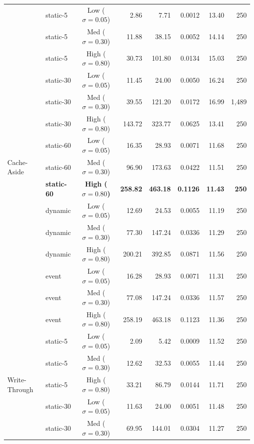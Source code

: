 \documentclass[11pt,a4paper]{article}
\begin{document}
\begin{small}
\begin{longtable}{llcrrrrr}
\multirow{15}{*}{Cache-Aside}
  & static-5  & Low ($\sigma=0.05$)    &   2.86 &   7.71 & 0.0012 & 13.40 & 250 \\
  & static-5  & Med ($\sigma=0.30$)    &  11.88 &  38.15 & 0.0052 & 14.14 & 250 \\
  & static-5  & High ($\sigma=0.80$)   &  30.73 & 101.80 & 0.0134 & 15.03 & 250 \\
  & static-30 & Low ($\sigma=0.05$)    &  11.45 &  24.00 & 0.0050 & 16.24 & 250 \\
  & static-30 & Med ($\sigma=0.30$)    &  39.55 & 121.20 & 0.0172 & 16.99 & 1{,}489 \\
  & static-30 & High ($\sigma=0.80$)   & 143.72 & 323.77 & 0.0625 & 13.41 & 250 \\
  & static-60 & Low ($\sigma=0.05$)    &  16.35 &  28.93 & 0.0071 & 11.68 & 250 \\
  & static-60 & Med ($\sigma=0.30$)    &  96.90 & 173.63 & 0.0422 & 11.51 & 250 \\
  & \textbf{static-60} & \textbf{High ($\sigma=0.80$)}
    & \textbf{258.82} & \textbf{463.18} & \textbf{0.1126} & \textbf{11.43} & \textbf{250} \\
  & dynamic   & Low ($\sigma=0.05$)    &  12.69 &  24.53 & 0.0055 & 11.19 & 250 \\
  & dynamic   & Med ($\sigma=0.30$)    &  77.30 & 147.24 & 0.0336 & 11.29 & 250 \\
  & dynamic   & High ($\sigma=0.80$)   & 200.21 & 392.85 & 0.0871 & 11.56 & 250 \\
  & event     & Low ($\sigma=0.05$)    &  16.28 &  28.93 & 0.0071 & 11.31 & 250 \\
  & event     & Med ($\sigma=0.30$)    &  77.08 & 147.24 & 0.0336 & 11.57 & 250 \\
  & event     & High ($\sigma=0.80$)   & 258.19 & 463.18 & 0.1123 & 11.36 & 250 \\
\midrule
\multirow{15}{*}{Write-Through}
  & static-5  & Low ($\sigma=0.05$)    &   2.09 &   5.42 & 0.0009 & 11.52 & 250 \\
  & static-5  & Med ($\sigma=0.30$)    &  12.62 &  32.53 & 0.0055 & 11.44 & 250 \\
  & static-5  & High ($\sigma=0.80$)   &  33.21 &  86.79 & 0.0144 & 11.71 & 250 \\
  & static-30 & Low ($\sigma=0.05$)    &  11.63 &  24.00 & 0.0051 & 11.48 & 250 \\
  & static-30 & Med ($\sigma=0.30$)    &  69.95 & 144.01 & 0.0304 & 11.27 & 250 \\

\end{longtable}
\end{small}
\end{document}
